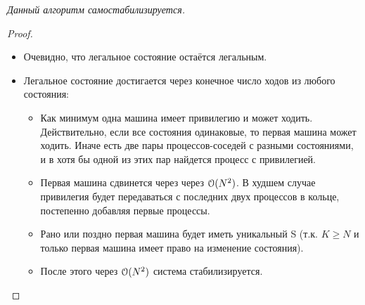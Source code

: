 \begin{theorem} 
    \textit{Данный алгоритм самостабилизируется.}
\end{theorem}
\begin{proof}
    \enewline
    \begin{itemize}
        \item Очевидно, что легальное состояние остаётся легальным.
        \item Легальное состояние достигается через конечное число ходов
            из любого состояния:
            \begin{itemize}
                \item Как минимум одна машина имеет привилегию и может ходить.
                    Действительно, если все состояния одинаковые, то первая
                    машина может ходить. Иначе есть две пары процессов-соседей
                    с разными состояниями, и в хотя бы одной из этих пар
                    найдется процесс с привилегией.
                \item Первая машина сдвинется через через $\mathcal{O}(N^2)$. В худшем
                    случае привилегия будет передаваться с последних двух
                    процессов в кольце, постепенно добавляя первые процессы. 
                \item Рано или поздно первая машина будет иметь уникальный S
                    (т.к. $K \geqslant N$ и только первая машина имеет право 
                    на изменение состояния).
                \item После этого через $\mathcal{O}(N^2)$ система стабилизируется.
            \end{itemize}
    \end{itemize}
\end{proof}

